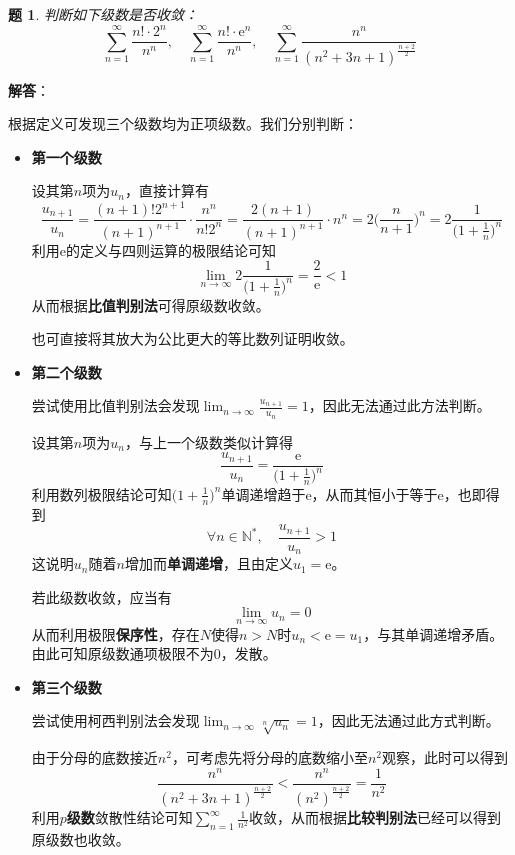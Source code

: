 \documentclass[a4paper,UTF8,fontset=windows,AutoFakeBold]{ctexart}
\newcommand*{\er}{\mathrm{e}}
\newcommand*{\suminf}[1][n=1]{\sum_{#1}^\infty}
\newcommand*{\note}{\noindent *}
\theoremstyle{ex}
\newtheorem{exercise}{题}
\newcommand{\sol}[1]{{\vspace{5pt}\kaishu\noindent\textbf{解答}：\vspace{-3pt}
\begin{compactitem}
    \item[] #1
\end{compactitem}
}}
\begin{document}
\begin{framed}
\begin{exercise}\label{mono plus unconv}
    判断如下级数是否收敛：
    $$\suminf\frac{n!\cdot2^n}{n^n},\quad\suminf\frac{n!\cdot\er^n}{n^n},\quad\suminf\frac{n^n}{(n^2+3n+1)^{\frac{n+2}{2}}}$$
\end{exercise}
\sol{
    根据定义可发现三个级数均为正项级数。我们分别判断：
    \begin{itemize}
        \item \textbf{第一个级数}
        
        设其第$n$项为$u_n$，直接计算有
        $$\frac{u_{n+1}}{u_n}=\frac{(n+1)!2^{n+1}}{(n+1)^{n+1}}\cdot\frac{n^n}{n!2^n}=\frac{2(n+1)}{(n+1)^{n+1}}\cdot n^n=2\bigg(\frac{n}{n+1}\bigg)^n=2\frac{1}{\big(1+\frac{1}{n}\big)^n}$$
        利用$\er$的定义与四则运算的极限结论可知
        $$\lim_{n\to\infty}2\frac{1}{\big(1+\frac{1}{n}\big)^n}=\frac{2}{\er}<1$$
        从而根据\textbf{比值判别法}可得原级数收敛。

        \note 也可直接将其放大为公比更大的等比数列证明收敛。
        
        \item \textbf{第二个级数}
        
        \note 尝试使用比值判别法会发现$\lim_{n\to\infty}\frac{u_{n+1}}{u_n}=1$，因此无法通过此方法判断。
        
        设其第$n$项为$u_n$，与上一个级数类似计算得
        $$\frac{u_{n+1}}{u_n}=\frac{\er}{\big(1+\frac{1}{n}\big)^n}$$
        利用数列极限结论可知$\big(1+\frac{1}{n}\big)^n$单调递增趋于$\er$，从而其恒小于等于$\er$，也即得到
        $$\forall n\in\mathbb{N}^*,\quad\frac{u_{n+1}}{u_n}>1$$
        这说明$u_n$随着$n$增加而\textbf{单调递增}，且由定义$u_1=\er$。

        若此级数收敛，应当有
        $$\lim_{n\to\infty}u_n=0$$
        从而利用极限\textbf{保序性}，存在$N$使得$n>N$时$u_n<\er=u_1$，与其单调递增矛盾。由此可知原级数通项极限不为0，发散。
        
        \item \textbf{第三个级数}
        
        \note 尝试使用柯西判别法会发现$\lim_{n\to\infty}\sqrt[n]{u_n}=1$，因此无法通过此方式判断。

        由于分母的底数接近$n^2$，可考虑先将分母的底数缩小至$n^2$观察，此时可以得到
        $$\frac{n^n}{(n^2+3n+1)^{\frac{n+2}{2}}}<\frac{n^n}{(n^2)^\frac{n+2}{2}}=\frac{1}{n^2}$$
        利用\textbf{$p$级数}敛散性结论可知$\suminf\frac{1}{n^2}$收敛，从而根据\textbf{比较判别法}已经可以得到原级数也收敛。
    \end{itemize}
}
\end{framed}
\end{document}
